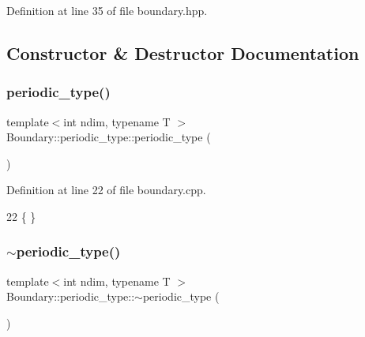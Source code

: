 Definition at line 35 of file boundary.\+hpp.



\subsection{Constructor \& Destructor Documentation}
\hypertarget{classshark_1_1ndim_1_1_boundary_1_1periodic__type_a2a2361be7dd3d056049d46160c7dbafa}{}\label{classshark_1_1ndim_1_1_boundary_1_1periodic__type_a2a2361be7dd3d056049d46160c7dbafa} 
\subsubsection{\texorpdfstring{periodic\+\_\+type()}{periodic\_type()}}
{\footnotesize\ttfamily template$<$int ndim, typename T $>$ \\
Boundary\+::periodic\+\_\+type\+::periodic\+\_\+type (\begin{DoxyParamCaption}{ }\end{DoxyParamCaption})}



Definition at line 22 of file boundary.\+cpp.


\begin{DoxyCode}
22 \{ \}
\end{DoxyCode}
\hypertarget{classshark_1_1ndim_1_1_boundary_1_1periodic__type_a0a83253b5e97de76c244b2a971416a19}{}\label{classshark_1_1ndim_1_1_boundary_1_1periodic__type_a0a83253b5e97de76c244b2a971416a19} 
\subsubsection{\texorpdfstring{$\sim$periodic\+\_\+type()}{~periodic\_type()}}
{\footnotesize\ttfamily template$<$int ndim, typename T $>$ \\
Boundary\+::periodic\+\_\+type\+::$\sim$periodic\+\_\+type (\begin{DoxyParamCaption}{ }\end{DoxyParamCaption})\hspace{0.3cm}{\ttfamily [virtual]}}



